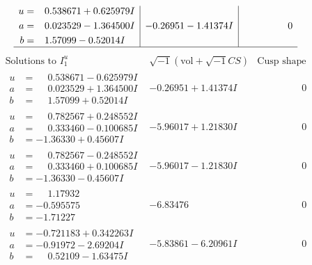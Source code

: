 \documentclass[1p]{elsarticle_modified}
\theoremstyle{definition}
\newcommand{\I}{\sqrt{-1}}
\begin{document}
$$\begin{array}{c|c|c}
\begin{aligned}
u &= \phantom{-}0.538671 + 0.625979 I \\
a &= \phantom{-}0.023529 - 1.364500 I \\
b &= \phantom{-}1.57099 - 0.52014 I\end{aligned}
 & -0.26951 - 1.41374 I & \phantom{-0.000000 } 0\\
 \hline 
 \end{array}$$\newpage$$\begin{array}{c|c|c}  
\text{Solutions to }I^u_{1}& \I (\text{vol} + \sqrt{-1}CS) & \text{Cusp shape}\\
 \hline 
\begin{aligned}
u &= \phantom{-}0.538671 - 0.625979 I \\
a &= \phantom{-}0.023529 + 1.364500 I \\
b &= \phantom{-}1.57099 + 0.52014 I\end{aligned}
 & -0.26951 + 1.41374 I & \phantom{-0.000000 } 0 \\ \hline\begin{aligned}
u &= \phantom{-}0.782567 + 0.248552 I \\
a &= \phantom{-}0.333460 - 0.100685 I \\
b &= -1.36330 + 0.45607 I\end{aligned}
 & -5.96017 + 1.21830 I & \phantom{-0.000000 } 0 \\ \hline\begin{aligned}
u &= \phantom{-}0.782567 - 0.248552 I \\
a &= \phantom{-}0.333460 + 0.100685 I \\
b &= -1.36330 - 0.45607 I\end{aligned}
 & -5.96017 - 1.21830 I & \phantom{-0.000000 } 0 \\ \hline\begin{aligned}
u &= \phantom{-}1.17932\phantom{ +0.000000I} \\
a &= -0.595575\phantom{ +0.000000I} \\
b &= -1.71227\phantom{ +0.000000I}\end{aligned}
 & -6.83476\phantom{ +0.000000I} & \phantom{-0.000000 } 0 \\ \hline\begin{aligned}
u &= -0.721183 + 0.342263 I \\
a &= -0.91972 - 2.69204 I \\
b &= \phantom{-}0.52109 - 1.63475 I\end{aligned}
 & -5.83861 - 6.20961 I & \phantom{-0.000000 } 0 \\ \hline\begin{aligned}

\end{aligned}
\end{array}$$
\end{document}
